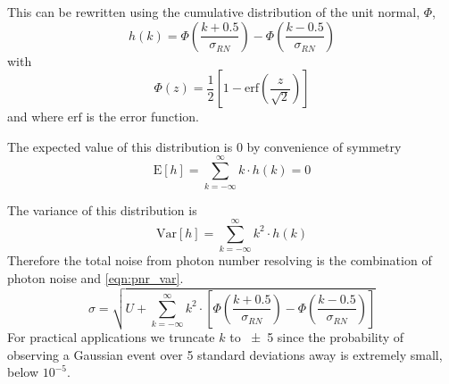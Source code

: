 This can be rewritten using the cumulative distribution of the unit normal, $\Phi$, 
\begin{equation}
    h(k) = \Phi\left(\frac{k + 0.5}{\sigma_{RN}} \right) - \Phi\left(\frac{k - 0.5}{\sigma_{RN}} \right)
\end{equation}
with
\begin{equation}
    \Phi(z) = \frac12 \left[1 - \mathrm{erf}\left(\frac{z}{\sqrt{2}}\right) \right]
\end{equation}
and where $\mathrm{erf}$ is the error function.

The expected value of this distribution is 0 by convenience of symmetry
\begin{equation}
    \mathrm{E}[h] = \sum_{k=-\infty}^{\infty}{ k \cdot h(k)} = 0
\end{equation}

The variance of this distribution is
\begin{equation}
\label{eqn:pnr_var}
    \mathrm{Var}[h] = \sum_{k=-\infty}^{\infty}{ k^2\cdot h(k)}
\end{equation}
Therefore the total noise from photon number resolving is the combination of photon noise and \autoref{eqn:pnr_var}.
\begin{equation}
    \label{eqn:pnr_std}
    \sigma = \sqrt{U + \sum_{k=-\infty}^{\infty}{ k^2\cdot \left[\Phi\left(\frac{k + 0.5}{\sigma_{RN}} \right) - \Phi\left(\frac{k - 0.5}{\sigma_{RN}}\right)\right]}}
\end{equation}
For practical applications we truncate $k$ to \num{\pm5} since the probability of observing a Gaussian event over 5 standard deviations away is extremely small,  below $10^{-5}$.

